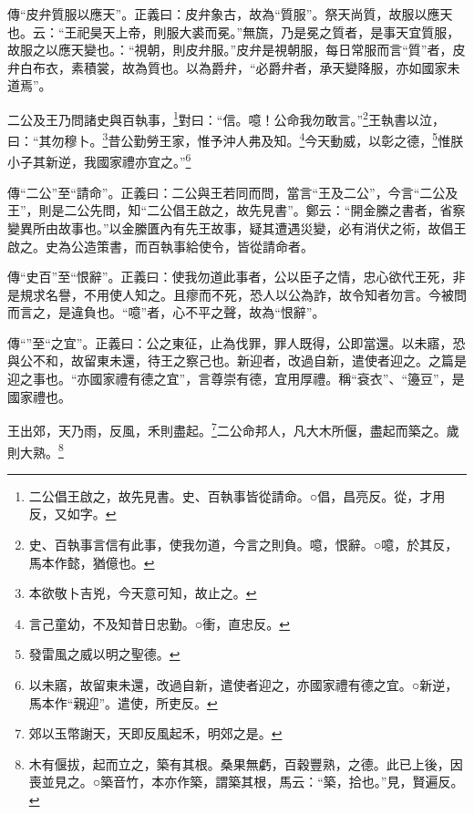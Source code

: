{\noindent\zhuan{}\fzbyks 傳“皮弁質服以應天”。正義曰：皮弁象古，故為“質服”。祭天尚質，故服以應天也。云：“王祀昊天上帝，則服大裘而冕。”無旒，乃是冕之質者，是事天宜質服，故服之以應天變也。：“視朝，則皮弁服。”皮弁是視朝服，每日常服而言“質”者，皮弁白布衣，素積裳，故為質也。以為爵弁，“必爵弁者，承天變降服，亦如國家未道焉”。 \par}

二公及王乃問諸史與百執事，\footnote{二公倡王啟之，故先見書。史、百執事皆從請命。○倡，昌亮反。從，才用反，又如字。}對曰：“信。噫！公命我勿敢言。”\footnote{史、百執事言信有此事，使我勿道，今言之則負。噫，恨辭。○噫，於其反，馬本作懿，猶億也。}王執書以泣，曰：“其勿穆卜。\footnote{本欲敬卜吉兇，今天意可知，故止之。}昔公勤勞王家，惟予沖人弗及知。\footnote{言己童幼，不及知昔日忠勤。○衝，直忠反。}今天動威，以彰之德，\footnote{發雷風之威以明之聖德。}惟朕小子其新逆，我國家禮亦宜之。”\footnote{以未寤，故留東未還，改過自新，遣使者迎之，亦國家禮有德之宜。○新逆，馬本作“親迎”。遣使，所吏反。}

{\noindent\zhuan{}\fzbyks 傳“二公”至“請命”。正義曰：二公與王若同而問，當言“王及二公”，今言“二公及王”，則是二公先問，知“二公倡王啟之，故先見書”。鄭云：“開金縢之書者，省察變異所由故事也。”以金縢匱內有先王故事，疑其遭遇災變，必有消伏之術，故倡王啟之。史為公造策書，而百執事給使令，皆從請命者。 \par}

{\noindent\zhuan{}\fzbyks 傳“史百”至“恨辭”。正義曰：使我勿道此事者，公以臣子之情，忠心欲代王死，非是規求名譽，不用使人知之。且瘳而不死，恐人以公為詐，故令知者勿言。今被問而言之，是違負也。“噫”者，心不平之聲，故為“恨辭”。 \par}

{\noindent\zhuan{}\fzbyks 傳“”至“之宜”。正義曰：公之東征，止為伐罪，罪人既得，公即當還。以未寤，恐與公不和，故留東未還，待王之察己也。新迎者，改過自新，遣使者迎之。之篇是迎之事也。“亦國家禮有德之宜”，言尊崇有德，宜用厚禮。稱“袞衣”、“籩豆”，是國家禮也。 \par}

王出郊，天乃雨，反風，禾則盡起。\footnote{郊以玉幣謝天，天即反風起禾，明郊之是。}二公命邦人，凡大木所偃，盡起而築之。歲則大熟。\footnote{木有偃拔，起而立之，築有其根。桑果無虧，百穀豐熟，之德。此已上後，因喪並見之。○築音竹，本亦作築，謂築其根，馬云：“築，拾也。”見，賢遍反。}

